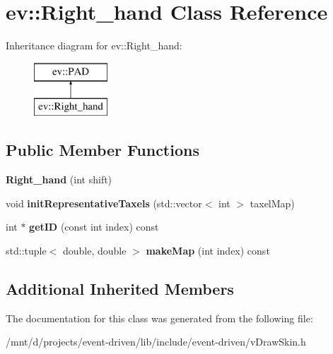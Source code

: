 \hypertarget{classev_1_1Right__hand}{}\section{ev\+:\+:Right\+\_\+hand Class Reference}
\label{classev_1_1Right__hand}
Inheritance diagram for ev\+:\+:Right\+\_\+hand\+:\begin{figure}[H]
\begin{center}
\leavevmode
\includegraphics[height=2.000000cm]{classev_1_1Right__hand}
\end{center}
\end{figure}
\subsection*{Public Member Functions}
\begin{DoxyCompactItemize}
\item 
\mbox{\label{classev_1_1Right__hand_ad26ab3cda248556854bf8d9073a449f7}} 
{\bfseries Right\+\_\+hand} (int shift)
\item 
\mbox{\label{classev_1_1Right__hand_a1c7c2dcfede67120e03eadb52b387e24}} 
void {\bfseries init\+Representative\+Taxels} (std\+::vector$<$ int $>$ taxel\+Map)
\item 
\mbox{\label{classev_1_1Right__hand_a6d314e7bccd20139b5da3cf1dcf0bcc3}} 
int $\ast$ {\bfseries get\+ID} (const int index) const
\item 
\mbox{\label{classev_1_1Right__hand_a1ccafa91c2d982046beeb757be83b7ad}} 
std\+::tuple$<$ double, double $>$ {\bfseries make\+Map} (int index) const
\end{DoxyCompactItemize}
\subsection*{Additional Inherited Members}


The documentation for this class was generated from the following file\+:\begin{DoxyCompactItemize}
\item 
/mnt/d/projects/event-\/driven/lib/include/event-\/driven/v\+Draw\+Skin.\+h\end{DoxyCompactItemize}
